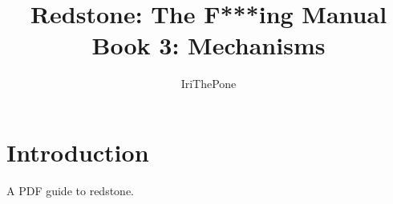 \documentclass[12pt]{article}
\title{Redstone: The F***ing Manual\\{\Large Book 3: Mechanisms}}
\author{IriThePone}
\begin{document}
\maketitle
\pagebreak
\tableofcontents
\pagebreak

\section{Introduction}
A PDF guide to redstone.
\pagebreak
\end{document}
